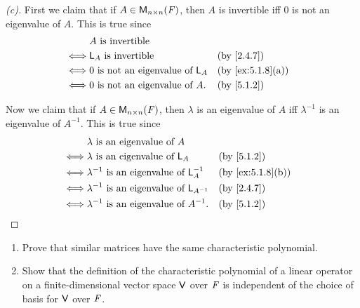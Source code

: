 \begin{proof}[(c)]
  First we claim that if \(A \in \mathsf{M}_{{n} \times n}({\mathit{F}})\), then \(A\) is invertible iff \(0\) is not an eigenvalue of \(A\).
  This is true since
  \begin{align*}
         & A \text{ is invertible}                                                     \\
    \iff & \L_A \text{ is invertible}              &  & \text{(by \cref{2.4.7})}       \\
    \iff & 0 \text{ is not an eigenvalue of } \L_A &  & \text{(by \cref{ex:5.1.8}(a))} \\
    \iff & 0 \text{ is not an eigenvalue of } A.   &  & \text{(by \cref{5.1.2})}
  \end{align*}

  Now we claim that if \(A \in \mathsf{M}_{{n} \times n}({\mathit{F}})\), then \(\lambda\) is an eigenvalue of \(A\) iff \(\lambda^{-1}\) is an eigenvalue of \(A^{-1}\).
  This is true since
  \begin{align*}
         & \lambda \text{ is an eigenvalue of } A                                                    \\
    \iff & \lambda \text{ is an eigenvalue of } \L_A             &  & \text{(by \cref{5.1.2})}       \\
    \iff & \lambda^{-1} \text{ is an eigenvalue of } \L_A^{-1}   &  & \text{(by \cref{ex:5.1.8}(b))} \\
    \iff & \lambda^{-1} \text{ is an eigenvalue of } \L_{A^{-1}} &  & \text{(by \cref{2.4.7})}       \\
    \iff & \lambda^{-1} \text{ is an eigenvalue of } A^{-1}.     &  & \text{(by \cref{5.1.2})}
  \end{align*}
\end{proof}

\begin{ex}\label{ex:5.1.12}
  \begin{enumerate}
    \item Prove that similar matrices have the same characteristic polynomial.
    \item Show that the definition of the characteristic polynomial of a linear operator on a finite-dimensional vector space \(\mathsf{V}\) over \(\mathit{F}\) is independent of the choice of basis for \(\mathsf{V}\) over \(\mathit{F}\).
  \end{enumerate}
\end{ex}

